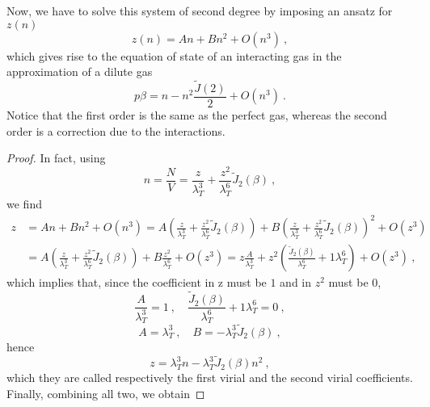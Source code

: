     Now, we have to solve this system of second degree by imposing an ansatz for $z(n)$
    \begin{equation*}
        z (n) = A n + B n^2 + O(n^3) ~,
    \end{equation*}
    which gives rise to the equation of state of an interacting gas in the approximation of a dilute gas
    \begin{equation*}
        p \beta = n - n^2 \frac{\tilde J(2)}{2} + O(n^3) ~.
    \end{equation*}
    Notice that the first order is the same as the perfect gas, whereas the second order is a correction due to the interactions.
    \begin{proof}
        In fact, using 
        \begin{equation*}
            n = \frac{N}{V} = \frac{z}{\lambda_T^3} + \frac{z^2}{\lambda_T^6} \tilde J_2 (\beta) ~,
        \end{equation*}
        we find 
        \begin{equation*}
        \begin{aligned}
            z & = A n + B n^2 + O(n^3) = A (\frac{z}{\lambda_T^3} + \frac{z^2}{\lambda_T^6} \tilde J_2 (\beta)) + B (\frac{z}{\lambda_T^3} + \frac{z^2}{\lambda_T^6} \tilde J_2 (\beta))^2 + O(z^3) \\ & = A (\frac{z}{\lambda_T^3} + \frac{z^2}{\lambda_T^6} \tilde J_2 (\beta)) + B \frac{z^2}{\lambda_T^6} + O(z^3) = z \frac{A}{\lambda_T^3} + z^2 ( \frac{\tilde J_2 (\beta)}{\lambda_T^6} + {1}{\lambda_T^6}) + O (z^3) ~,
        \end{aligned}
        \end{equation*}
        which implies that, since the coefficient in z must be $1$ and in $z^2$ must be $0$, 
        \begin{equation*}
            \frac{A}{\lambda_T^3} = 1 ~, \quad \frac{\tilde J_2 (\beta)}{\lambda_T^6} + {1}{\lambda_T^6} = 0 ~,
        \end{equation*}
        \begin{equation*}
            A = \lambda_T^3 ~, \quad B = - \lambda^3_T \tilde J_2(\beta) ~,
        \end{equation*}
        hence 
        \begin{equation*}
            z = \lambda_T^3 n - \lambda^3_T \tilde J_2(\beta) n^2 ~,
        \end{equation*}
        which they are called respectively the first virial and the second virial coefficients.
        Finally, combining all two, we obtain 

\end{proof}
